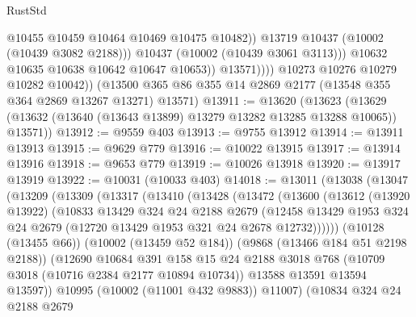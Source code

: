 \begin{lexlean}{RustStd}
\begin{coremodule}
                            @10455
                            @10459
                            @10464
                            @10469
                            @10475
                            @10482))
                        @13719
                        @10437
                        (@10002 (@10439 @3082 @2188)))
                      @10437
                      (@10002 (@10439 @3061 @3113)))
                    @10632
                    @10635
                    @10638
                    @10642
                    @10647
                    @10653))
                @13571))))
        @10273
        @10276
        @10279
        @10282
        @10042))
    (@13500 @365 @86 @355 @14 @2869 @2177 (@13548 @355 @364 @2869 @13267 @13271) @13571)
@13911 := @13620
    (@13623 (@13629 (@13632 (@13640 (@13643 @13899) @13279 @13282 @13285 @13288 @10065)) @13571))
@13912 := @9559 @403
@13913 := @9755 @13912
@13914 := @13911 @13913
@13915 := @9629 @779
@13916 := @10022 @13915
@13917 := @13914 @13916
@13918 := @9653 @779
@13919 := @10026 @13918
@13920 := @13917 @13919
@13922 := @10031 (@10033 @403)
@14018 := @13011
    (@13038
      (@13047
        (@13209
          (@13309
            (@13317
              (@13410
                (@13428
                  (@13472
                    (@13600
                      (@13612
                        (@13920 @13922)
                        (@10833
                          @13429
                          @324
                          @24
                          @2188
                          @2679
                          (@12458
                            @13429
                            @1953
                            @324
                            @24
                            @2679
                            (@12720 @13429 @1953 @321 @24 @2678 @12732))))))
                  (@10128 (@13455 @66))
                  (@10002 (@13459 @52 @184))
                  (@9868 (@13466 @184 @51 @2198 @2188))
                  (@12690
                    @10684
                    @391
                    @158
                    @15
                    @24
                    @2188
                    @3018
                    @768
                    (@10709 @3018 (@10716 @2384 @2177 @10894 @10734))
                    @13588
                    @13591
                    @13594
                    @13597))
                @10995
                (@10002 (@11001 @432 @9883))
                @11007)
              (@10834
                @324
                @24
                @2188
                @2679

\end{coremodule}
\end{lexlean}
